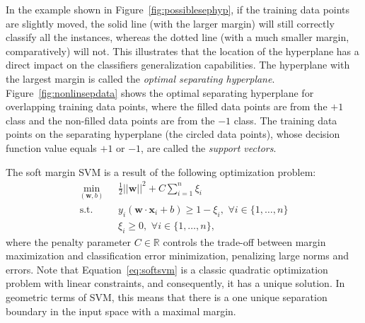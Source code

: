 \documentclass[reqno]{vcuthesis}
\newcommand{\reals}{{\mathbb{R}}}
\numberwithin{equation}{chapter}
\begin{document}
In the example shown in Figure~\ref{fig:possiblesephyp}, if the training data points are slightly moved, the solid line (with the larger margin) will still correctly classify all the instances, whereas the dotted line (with a much smaller margin, comparatively) will not. This illustrates that the location of the hyperplane has a direct impact on the classifiers generalization capabilities. The hyperplane with the largest margin is called the \textit{optimal separating hyperplane}. Figure~\ref{fig:nonlinsepdata} shows the optimal separating hyperplane for overlapping training data points, where the filled data points are from the $+1$ class and the non-filled data points are from the $-1$ class. The training data points on the separating hyperplane (the circled data points), whose decision function value equals $+1$ or $-1$, are called the \textit{support vectors}. 

The soft margin SVM is a result of the following optimization problem:
\begin{equation}
\label{eq:softsvm}
\begin{aligned}
\min\limits_{(\bm{w},b)} &{\,\,\,\,} \frac{1}{2}||\bm{w}||^2 + C\sum_{i=1}^n \xi_i \\
\text{s.t.} & {\,\,\,\,} y_i\left( \bm{w} \cdot \bm{x}_i + b\right) \geq 1 - \xi_i, {\,\,} \forall i \in \{1,\ldots,n\} \\
 & {\,\,\,\,} \xi_i \geq 0, {\,\,} \forall i \in \{1,\ldots,n\},
\end{aligned}
\end{equation}
where the penalty parameter $C \in \reals$ controls the trade-off between margin maximization and classification error minimization, penalizing large norms and errors. Note that Equation~\ref{eq:softsvm} is a classic quadratic optimization problem with linear constraints, and consequently, it has a unique solution. In geometric terms of SVM, this means that there is a one unique separation boundary in the input space with a maximal margin.
\end{document}
